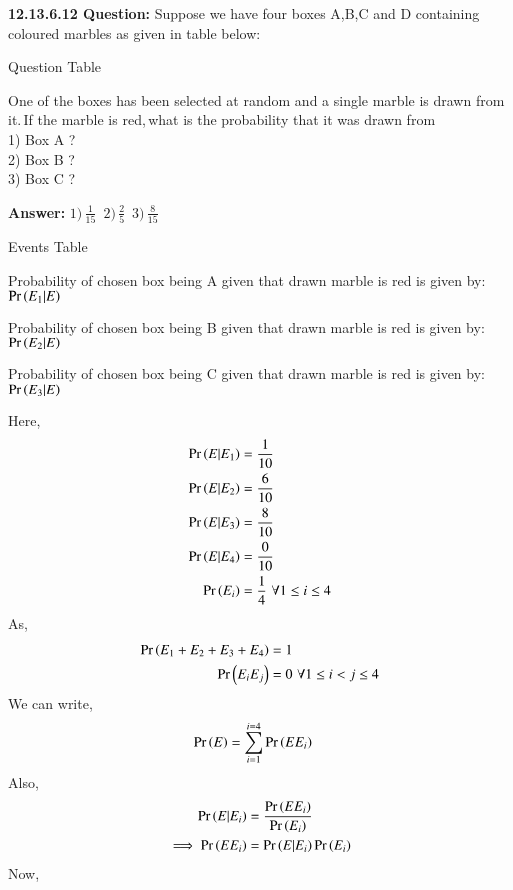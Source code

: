 \documentclass[journal,12pt]{IEEEtran}
\begin{document}
%

\textbf{12.13.6.12 Question:} Suppose we have four boxes A,B,C and D containing coloured marbles as given in table below:
\begin{table}[htbp]
\centering

\caption{Question Table}
\label{tab:table1}
\end{table}
One of the boxes has been selected at random and a single marble is drawn from it.$\,$If the marble is red,$\,$what is the probability that it was drawn from \\1) Box A ?\\2) Box B ?\\3) Box C ?


\textbf{Answer:} \( 1)\,\frac{1}{15} \, \) \( 2)\,\frac{2}{5}\,\) \( 3)\,\frac{8}{15}\,\) 

\solution
\begin{table}[htb]
\centering

\caption{Events Table}
\label{tab:table2}
\end{table}
Probability of chosen box being A given that drawn marble is red is given by: \(\Pr\left(E_1\vert E\right)\) 

Probability of chosen box being B given that drawn marble is red is given by: \(\Pr\left(E_2\vert E\right)\) 

Probability of chosen box being C given that drawn marble is red is given by: \(\Pr\left(E_3\vert E\right)\)

Here,
\begin{align}
\Pr\left(E\vert E_1\right)&=\frac{1}{10}\\
\Pr\left(E\vert E_2\right)&=\frac{6}{10}\\
\Pr\left(E\vert E_3\right)&=\frac{8}{10}\\
\Pr\left(E\vert E_4\right)&=\frac{0}{10}\\
\Pr\left(E_i\right)&=\frac{1}{4}\,\, \forall 1\le i \le 4
\end{align}
As,
\begin{align}
\Pr\left(E_1+E_2+E_3+E_4\right)&=1\\
\Pr\left(E_iE_j\right)&=0\,\,\forall 1\le i < j \le 4
\end{align}
We can write,
\begin{align}
\Pr\left(E\right)&= \sum_{i=1}^{i=4}{\Pr\left(EE_i\right)}\label{eq:1}
\end{align}
Also,
\begin{align}
\Pr\left(E|E_i\right)&=\frac{\Pr\left(EE_i\right)}{\Pr\left(E_i\right)}\label{eq:2}\\
\implies\Pr\left(EE_i\right)&=\Pr\left(E|E_i\right)\Pr\left(E_i\right)\label{eq:3}
\end{align}
Now,
\end{document}
